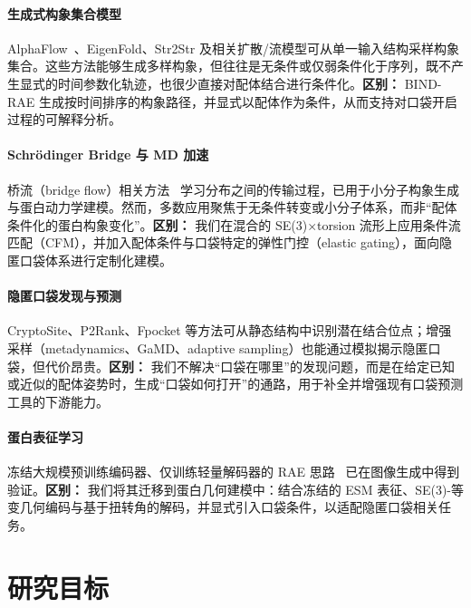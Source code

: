 \documentclass[11pt,a4paper,fontset=fandol]{ctexart}
\begin{document}
\paragraph{生成式构象集合模型}
AlphaFlow~\cite{jing2024alphafold}、EigenFold、Str2Str 及相关扩散/流模型可从单一输入结构采样构象集合。这些方法能够生成多样构象，但往往是无条件或仅弱条件化于序列，既不产生显式的时间参数化轨迹，也很少直接对配体结合进行条件化。\textbf{区别：} BIND-RAE 生成按时间排序的构象路径，并显式以配体作为条件，从而支持对口袋开启过程的可解释分析。

\paragraph{Schrödinger Bridge 与 MD 加速}
桥流（bridge flow）相关方法~\cite{somnath2023aligned, vargas2024scoobdoob} 学习分布之间的传输过程，已用于小分子构象生成与蛋白动力学建模。然而，多数应用聚焦于无条件转变或小分子体系，而非“配体条件化的蛋白构象变化”。\textbf{区别：} 我们在混合的 SE(3)$\times$torsion 流形上应用条件流匹配（CFM），并加入配体条件与口袋特定的弹性门控（elastic gating），面向隐匿口袋体系进行定制化建模。

\paragraph{隐匿口袋发现与预测}
CryptoSite、P2Rank、Fpocket 等方法可从静态结构中识别潜在结合位点；增强采样（metadynamics、GaMD、adaptive sampling）也能通过模拟揭示隐匿口袋，但代价昂贵。\textbf{区别：} 我们不解决“口袋在哪里”的发现问题，而是在给定已知或近似的配体姿势时，生成“口袋如何打开”的通路，用于补全并增强现有口袋预测工具的下游能力。

\paragraph{蛋白表征学习}
冻结大规模预训练编码器、仅训练轻量解码器的 RAE 思路~\cite{zheng2025diffusion} 已在图像生成中得到验证。\textbf{区别：} 我们将其迁移到蛋白几何建模中：结合冻结的 ESM 表征、SE(3)-等变几何编码与基于扭转角的解码，并显式引入口袋条件，以适配隐匿口袋相关任务。

\section{研究目标}
\end{document}
